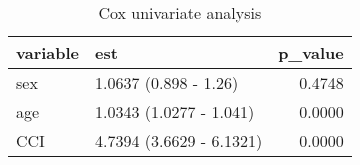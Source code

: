 \begin{table}

\caption{Cox univariate analysis}
\centering
\begin{tabular}[t]{l|l|r}
\hline
variable & est & p\_value\\
\hline
sex & 1.0637 (0.898 - 1.26) & 0.4748\\
\hline
age & 1.0343 (1.0277 - 1.041) & 0.0000\\
\hline
CCI & 4.7394 (3.6629 - 6.1321) & 0.0000\\
\hline
\end{tabular}
\end{table}
